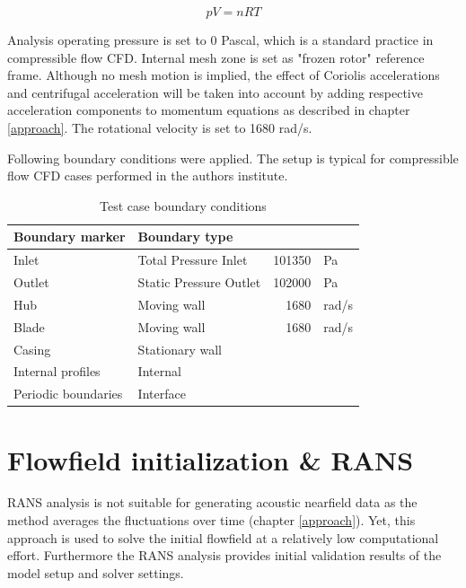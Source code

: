 \begin{equation} \label{eq:stadair}
p V = n R T
\end{equation}

Analysis operating pressure is set to 0 Pascal, which is a standard practice in compressible flow CFD. Internal mesh zone is set as "frozen rotor" reference frame. Although no mesh motion is implied, the effect of Coriolis accelerations and centrifugal acceleration will be taken into account by adding respective acceleration components to momentum equations as described in chapter \ref{approach}. The rotational velocity is set to 1680 rad/s.

Following boundary conditions were applied. The setup is typical for compressible flow CFD cases performed in the authors institute.

\begin{table}[htb!]
\centering
\caption{Test case boundary conditions} \label{tab:testbcs}
\ttfamily
\begin{tabular}{@{}llrl@{}}
\toprule
Boundary marker & Boundary type & & \\ \midrule
Inlet & Total Pressure Inlet & 101350  & Pa\\
Outlet & Static Pressure Outlet & 102000 & Pa \\
Hub & Moving wall & 1680 & rad/s \\
Blade & Moving wall & 1680 & rad/s \\
Casing & Stationary wall & &  \\
Internal profiles & Internal & & \\
Periodic boundaries & Interface & & \\ \bottomrule
\end{tabular}
\end{table}


\section{Flowfield initialization \& RANS}
RANS analysis is not suitable for generating acoustic nearfield data as the method averages the fluctuations over time (chapter \ref{approach}). Yet, this approach is used to solve the initial flowfield at a relatively low computational effort. Furthermore the RANS analysis provides initial validation results of the model setup and solver settings.

